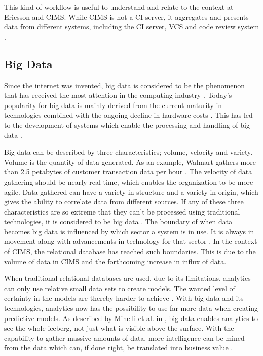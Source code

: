 This kind of workflow is useful to understand and relate to the context at Ericsson and CIMS. While CIMS is not a CI server, it aggregates and presents data from different systems, including the CI server, VCS and code review system .


\subsection{Big Data}
Since the internet was invented, big data is considered to be the phenomenon that has received the most attention in the computing industry \cite{bigDataWarehouse}. Today's popularity for big data is mainly derived from the current maturity in technologies combined with the ongoing decline in hardware costs \cite{bigDataWarehouse, bigDatabigAn}. This has led to the development of systems which enable the processing and handling of big data \cite{bigDataWarehouse}.

Big data can be described by three characteristics; volume, velocity and variety. Volume is the quantity of data generated. As an example, Walmart gathers more than 2.5 petabytes of customer transaction data per hour \cite{bigDataMane}. The velocity of data gathering should be nearly real-time, which enables the organization to be more agile. Data gathered can have a variety in structure and a variety in origin, which gives the ability to correlate data from different sources. If any of these three characteristics are so extreme that they can't be processed using traditional technologies, it is considered to be big data \cite{bigDataWarehouse}. The boundary of when data becomes big data is influenced by which sector a system is in use. It is always in movement along with advancements in technology for that sector \cite{bigDatabigAn}. In the context of CIMS, the relational database has reached such boundaries. This is due to the volume of data in CIMS and the forthcoming increase in influx of data.  

When traditional relational databases are used, due to its limitations, analytics can only use relative small data sets to create models. The wanted level of certainty in the models are thereby harder to achieve \cite{bigDatabigAn}. With big data and its technologies, analytics now has the possibility to use far more data when creating predictive models. As described by Minelli et al. in \cite{bigDatabigAn}, big data enables analytics to see the whole iceberg, not just what is visible above the surface. With the capability to gather massive amounts of data, more intelligence can be mined from the data which can, if done right, be translated into business value \cite{bigDataMane}.




